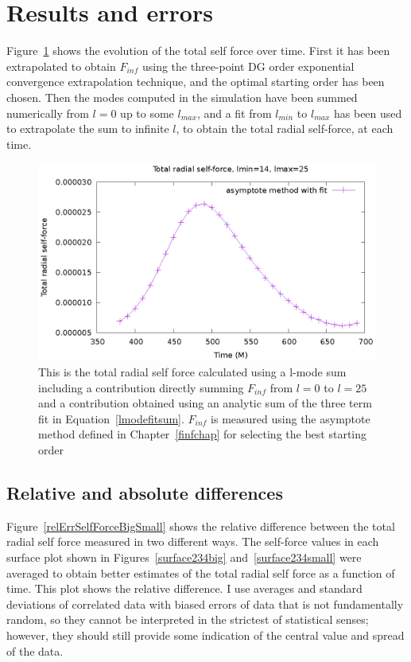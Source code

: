 \section{Results and errors}

Figure~\ref{totalselfforcevt2} shows the evolution of the total self force over time. First it has been extrapolated to obtain $F_{inf}$ using the three-point DG order exponential convergence extrapolation technique, and the optimal starting order has been chosen. Then the modes computed in the simulation have been summed numerically from $l=0$ up to some $l_{max}$, and a fit from $l_{min}$ to $l_{max}$ has been used to extrapolate the sum to infinite $l$, to obtain the total radial self-force, at each time. 


\begin{figure}
  \includegraphics{totalselfforcevt2.eps}
  \caption{This is the total radial self force calculated using a l-mode sum including a contribution directly summing $F_{inf}$ from $l=0$ to $l=25$ and a contribution obtained using an analytic sum of the three term fit in Equation~\ref{lmodefitsum}. $F_{inf}$ is measured using the asymptote method defined in Chapter~\ref{finfchap} for selecting the best starting order}
\label{totalselfforcevt2}
\end{figure}


\subsection{Relative and absolute differences}

Figure~\ref{relErrSelfForceBigSmall} shows the relative difference between the total radial self force measured in two different ways. The self-force values in each surface plot shown in Figures~\ref{surface234big} and~\ref{surface234small} were averaged to obtain better estimates of the total radial self force as a function of time. This plot shows the relative difference. I use averages and standard deviations of correlated data with biased errors of data that is not fundamentally random, so they cannot be interpreted in the strictest of statistical senses; however, they should still provide some indication of the central value and spread of the data.

